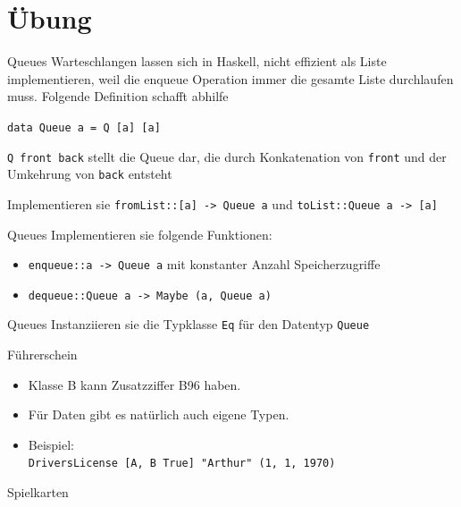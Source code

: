 \documentclass{beamer}
\begin{document}
\section{Übung}

\begin{frame}{Queues}
  Warteschlangen lassen sich in Haskell, nicht effizient als Liste implementieren, weil die enqueue Operation immer die gesamte Liste durchlaufen muss. Folgende Definition schafft abhilfe
  
  \texttt{data Queue a = Q [a] [a]}

  \texttt{Q front back} stellt die Queue dar, die durch Konkatenation von \texttt{front} und der Umkehrung von \texttt{back} entsteht

  Implementieren sie \texttt{fromList::[a] -> Queue a} und \texttt{toList::Queue a -> [a]}
\end{frame}

\begin{frame}{Queues}
    Implementieren sie folgende Funktionen:
    \begin{itemize}
        \item \texttt{enqueue::a -> Queue a} mit konstanter Anzahl Speicherzugriffe
        \item \texttt{dequeue::Queue a -> Maybe (a, Queue a)}
    \end{itemize}
\end{frame}

\begin{frame}{Queues}
    Instanziieren sie die Typklasse \texttt{Eq} für den Datentyp \texttt{Queue}
\end{frame}

\begin{frame}{Führerschein}

  \vfill

  \begin{itemize}
    \item Klasse B kann Zusatzziffer B96 haben.
    \item Für Daten gibt es natürlich auch eigene Typen.
    \item Beispiel:\\
          \texttt{DriversLicense [A, B True] "{}Arthur"{} (1, 1, 1970)}
  \end{itemize}
\end{frame}

\begin{frame}{Spielkarten}
\end{frame}
\end{document}
